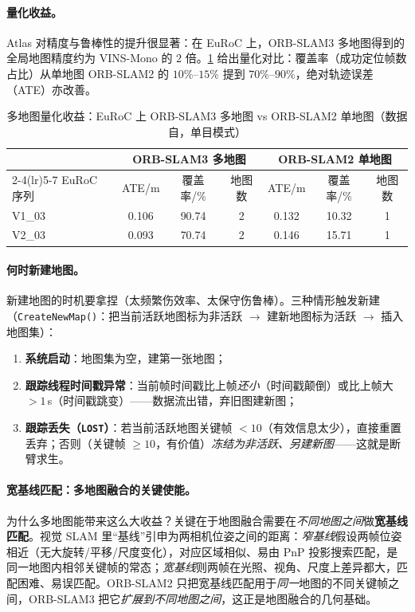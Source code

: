 \paragraph{量化收益。}
Atlas 对精度与鲁棒性的提升很显著：在 EuRoC 上，ORB-SLAM3 多地图得到的全局地图精度约为 VINS-Mono 的 $2$ 倍\cite{campos2021orbslam3,elvira2019atlas}。\cref{tab:vio-multimap} 给出量化对比：覆盖率（成功定位帧数占比）从单地图 ORB-SLAM2 的 $10\%$--$15\%$ 提到 $70\%$--$90\%$，绝对轨迹误差（ATE）亦改善。

\begin{table}[H]\centering\small
\caption{多地图量化收益：EuRoC 上 ORB-SLAM3 多地图 vs ORB-SLAM2 单地图（数据自\cite{campos2021orbslam3}，单目模式）}
\label{tab:vio-multimap}
\begin{tabular}{lcccccc}
\toprule
& \multicolumn{3}{c}{ORB-SLAM3 多地图} & \multicolumn{3}{c}{ORB-SLAM2 单地图} \\
\cmidrule(lr){2-4}\cmidrule(lr){5-7}
EuRoC 序列 & ATE/m & 覆盖率/\% & 地图数 & ATE/m & 覆盖率/\% & 地图数 \\
\midrule
V1\_03 & 0.106 & 90.74 & 2 & 0.132 & 10.32 & 1 \\
V2\_03 & 0.093 & 70.74 & 2 & 0.146 & 15.71 & 1 \\
\bottomrule
\end{tabular}
\end{table}

\paragraph{何时新建地图。}
新建地图的时机要拿捏（太频繁伤效率、太保守伤鲁棒）\cite{campos2021orbslam3}。三种情形触发新建（\texttt{CreateNewMap()}：把当前活跃地图标为非活跃 $\to$ 建新地图标为活跃 $\to$ 插入地图集）：
\begin{enumerate}
  \item \textbf{系统启动}：地图集为空，建第一张地图；
  \item \textbf{跟踪线程时间戳异常}：当前帧时间戳比上帧\emph{还小}（时间戳颠倒）或比上帧大 $>1\,$s（时间戳跳变）——数据流出错，弃旧图建新图；
  \item \textbf{跟踪丢失（\texttt{LOST}）}：若当前活跃地图关键帧 $<10$（有效信息太少），直接重置丢弃；否则（关键帧 $\ge 10$，有价值）\emph{冻结为非活跃、另建新图}——这就是断臂求生。
\end{enumerate}

\paragraph{宽基线匹配：多地图融合的关键使能。}
为什么多地图能带来这么大收益？关键在于地图融合需要在\emph{不同地图之间}做\textbf{宽基线匹配}\cite{campos2021orbslam3}。视觉 SLAM 里“基线”引申为两相机位姿之间的距离：\emph{窄基线}假设两帧位姿相近（无大旋转/平移/尺度变化），对应区域相似、易由 PnP 投影搜索匹配，是同一地图内相邻关键帧的常态；\emph{宽基线}则两帧在光照、视角、尺度上差异都大，匹配困难、易误匹配。ORB-SLAM2 只把宽基线匹配用于\emph{同一}地图的不同关键帧之间，ORB-SLAM3 把它\emph{扩展到不同地图之间}，这正是地图融合的几何基础。

